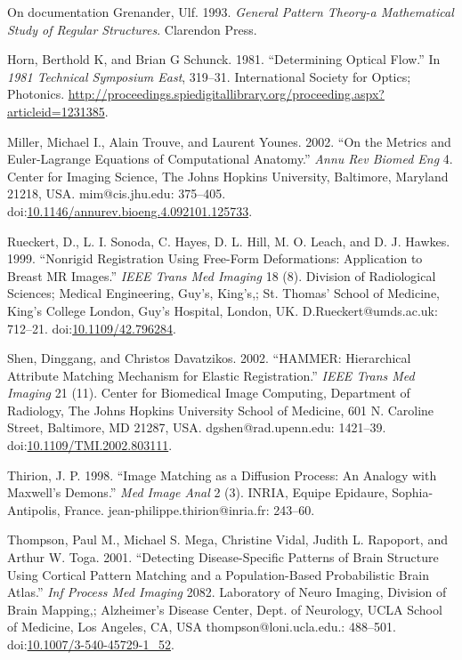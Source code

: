 \documentclass[ignorenonframetext,]{beamer}
\begin{document}
\begin{frame}{On documentation}
\hypertarget{ref-Grenander1993}{}
Grenander, Ulf. 1993. \emph{General Pattern Theory-a Mathematical Study
of Regular Structures}. Clarendon Press.

\hypertarget{ref-Horn1981}{}
Horn, Berthold K, and Brian G Schunck. 1981. ``Determining Optical
Flow.'' In \emph{1981 Technical Symposium East}, 319--31. International
Society for Optics; Photonics.
\url{http://proceedings.spiedigitallibrary.org/proceeding.aspx?articleid=1231385}.

\hypertarget{ref-Miller2002}{}
Miller, Michael I., Alain Trouve, and Laurent Younes. 2002. ``On the
Metrics and Euler-Lagrange Equations of Computational Anatomy.''
\emph{Annu Rev Biomed Eng} 4. Center for Imaging Science, The Johns
Hopkins University, Baltimore, Maryland 21218, USA. mim@cis.jhu.edu:
375--405.
doi:\href{https://doi.org/10.1146/annurev.bioeng.4.092101.125733}{10.1146/annurev.bioeng.4.092101.125733}.

\hypertarget{ref-Rueckert1999}{}
Rueckert, D., L. I. Sonoda, C. Hayes, D. L. Hill, M. O. Leach, and D. J.
Hawkes. 1999. ``Nonrigid Registration Using Free-Form Deformations:
Application to Breast MR Images.'' \emph{IEEE Trans Med Imaging} 18 (8).
Division of Radiological Sciences; Medical Engineering, Guy's, King's,;
St. Thomas' School of Medicine, King's College London, Guy's Hospital,
London, UK. D.Rueckert@umds.ac.uk: 712--21.
doi:\href{https://doi.org/10.1109/42.796284}{10.1109/42.796284}.

\hypertarget{ref-Shen2002}{}
Shen, Dinggang, and Christos Davatzikos. 2002. ``HAMMER: Hierarchical
Attribute Matching Mechanism for Elastic Registration.'' \emph{IEEE
Trans Med Imaging} 21 (11). Center for Biomedical Image Computing,
Department of Radiology, The Johns Hopkins University School of
Medicine, 601 N. Caroline Street, Baltimore, MD 21287, USA.
dgshen@rad.upenn.edu: 1421--39.
doi:\href{https://doi.org/10.1109/TMI.2002.803111}{10.1109/TMI.2002.803111}.

\hypertarget{ref-Thirion1998}{}
Thirion, J. P. 1998. ``Image Matching as a Diffusion Process: An Analogy
with Maxwell's Demons.'' \emph{Med Image Anal} 2 (3). INRIA, Equipe
Epidaure, Sophia-Antipolis, France. jean-philippe.thirion@inria.fr:
243--60.

\hypertarget{ref-Thompson2001}{}
Thompson, Paul M., Michael S. Mega, Christine Vidal, Judith L. Rapoport,
and Arthur W. Toga. 2001. ``Detecting Disease-Specific Patterns of Brain
Structure Using Cortical Pattern Matching and a Population-Based
Probabilistic Brain Atlas.'' \emph{Inf Process Med Imaging} 2082.
Laboratory of Neuro Imaging, Division of Brain Mapping,; Alzheimer's
Disease Center, Dept. of Neurology, UCLA School of Medicine, Los
Angeles, CA, USA thompson@loni.ucla.edu.: 488--501.
doi:\href{https://doi.org/10.1007/3-540-45729-1_52}{10.1007/3-540-45729-1\_52}.

\end{frame}
\end{document}
